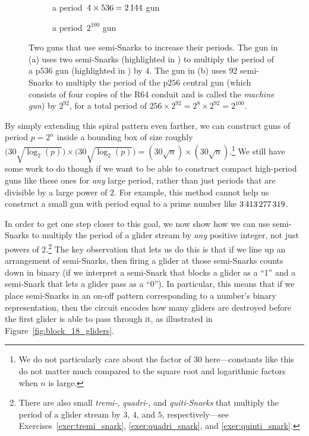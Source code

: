 \begin{figure}[!htb]
	\centering
	\begin{subfigure}{0.415\textwidth}
		\centering\vspace*{1.73cm}
		\caption{a period~$4 \times 536 = 2{\,}144$ gun}
		\label{fig:p2144_gun}
	\end{subfigure} \hfill %
	\begin{subfigure}{0.555\textwidth}
		\centering
		\caption{a period~$2^{100}$ gun}
		\label{fig:p_2_100_gun}
	\end{subfigure}
	\caption{Two guns that use semi-Snarks to increase their periods. The gun in (a) uses two semi-Snarks (highlighted in ) to multiply the period of a p$536$ gun (highlighted in ) by $4$. The gun in (b) uses $92$ semi-Snarks to multiply the period of the p$256$ central gun (which consists of four copies of the R64 conduit and is called the \emph{machine gun}) by $2^{92}$, for a total period of $256 \times 2^{92} = 2^8 \times 2^{92} = 2^{100}$.}
	\label{fig:semi_snark_compact_guns}
\end{figure}

By simply extending this spiral pattern even farther, we can construct guns of period $p = 2^n$ inside a bounding box of size roughly $\big(30\sqrt{\log_2(p)}\big) \times \big(30\sqrt{\log_2(p)}\big) = (30\sqrt{n}) \times (30\sqrt{n})$.\footnote{We do not particularly care about the factor of $30$ here---constants like this do not matter much compared to the square root and logarithmic factors when $n$ is large.} We still have some work to do though if we want to be able to construct compact high-period guns like these ones for \emph{any} large period, rather than just periods that are divisible by a large power of $2$. For example, this method cannot help us construct a small gun with period equal to a prime number like $3{\,}413{\,}277{\,}319$.

In order to get one step closer to this goal, we now show how we can use semi-Snarks to multiply the period of a glider stream by \emph{any} positive integer, not just powers of $2$.\footnote{There are also small \emph{tremi-}, \emph{quadri-}, and \emph{quiti-Snarks} that multiply the period of a glider stream by $3$, $4$, and $5$, respectively---see Exercises~\ref{exer:tremi_snark}, \ref{exer:quadri_snark}, and \ref{exer:quinti_snark}.} The key observation that lets us do this is that if we line up an arrangement of semi-Snarks, then firing a glider at those semi-Snarks counts down in binary (if we interpret a semi-Snark that blocks a glider as a ``1'' and a semi-Snark that lets a glider pass as a ``0''). In particular, this means that if we place semi-Snarks in an on-off pattern corresponding to a number's binary representation, then the circuit encodes how many gliders are destroyed before the first glider is able to pass through it, as illustrated in Figure~\ref{fig:block_18_gliders}.

